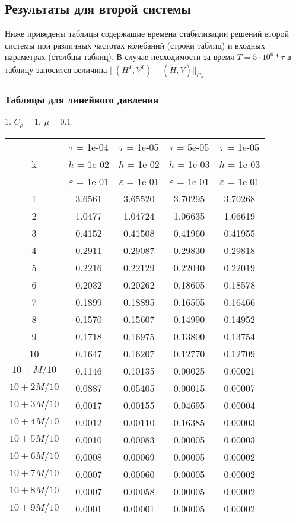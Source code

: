 \subsection{Результаты для второй системы}
Ниже приведены таблицы содержащие времена стабилизации решений второй системы при различных частотах колебаний (строки таблиц) и входных параметрах (столбцы таблиц). В случае несходимости за время $T = 5 \cdot 10^6 * \tau$ в таблицу заносится величина $|| (H^T, V^T) - (\tilde{H}, \tilde{V})||_{C_h}$
\subsubsection{Таблицы для линейного давления}
1. $C_{\rho} = 1, \ \mu = 0.1$
\begin{center}
	\begin{tabular}{ |c|c|c|c|c| } 
		\hline
		  & $\tau$ = 1e-04 & $\tau$ = 1e-05 & $\tau$ = 5e-05 & $\tau$ = 1e-05 \\ 
		k & $h$ = 1e-02 & $h$ = 1e-02 & $h$ = 1e-03 & $h$ = 1e-03 \\ 
		  & $\varepsilon$ = 1e-01 & $\varepsilon$ = 1e-01 & $\varepsilon$ = 1e-01 & $\varepsilon$ = 1e-01 \\ 
		\hline
		1 & 3.6561 & 3.65520 & 3.70295 & 3.70268 \\
		\hline
		2 & 1.0477 & 1.04724 & 1.06635 & 1.06619 \\
		\hline
		3 & 0.4152 & 0.41508 & 0.41960 & 0.41955 \\
		\hline
		4 & 0.2911 & 0.29087 & 0.29830 & 0.29818 \\
		\hline
		5 & 0.2216 & 0.22129 & 0.22040 & 0.22019 \\
		\hline
		6 & 0.2032 & 0.20262 & 0.18605 & 0.18578 \\
		\hline
		7 & 0.1899 & 0.18895 & 0.16505 & 0.16466 \\
		\hline
		8 & 0.1570 & 0.15607 & 0.14990 & 0.14952 \\
		\hline
		9 & 0.1718 & 0.16975 & 0.13800 & 0.13754 \\
		\hline
		10 & 0.1647 & 0.16207 & 0.12770 & 0.12709 \\
		\hline
		$10 + M/10$ & 0.1146 & 0.10135 & 0.00025 & 0.00021 \\
		\hline
		$10 + 2M/10$ & 0.0887 & 0.05405 & 0.00015 & 0.00007 \\
		\hline
		$10 + 3M/10$ & 0.0017 & 0.00155 & 0.04695 & 0.00004 \\
		\hline
		$10 + 4M/10$ & 0.0012 & 0.00110 & 0.16385 & 0.00003 \\
		\hline
		$10 + 5M/10$ & 0.0010 & 0.00083 & 0.00005 & 0.00003 \\
		\hline
		$10 + 6M/10$ & 0.0008 & 0.00069 & 0.00005 & 0.00002 \\
		\hline
		$10 + 7M/10$ & 0.0007 & 0.00060 & 0.00005 & 0.00002 \\
		\hline
		$10 + 8M/10$ & 0.0007 &  0.00058 & 0.00005 & 0.00002 \\
		\hline
		$10 + 9M/10$ & 0.0001 & 0.00001 & 0.00005 & 0.00002 \\
		\hline
	\end{tabular}
\end{center}

